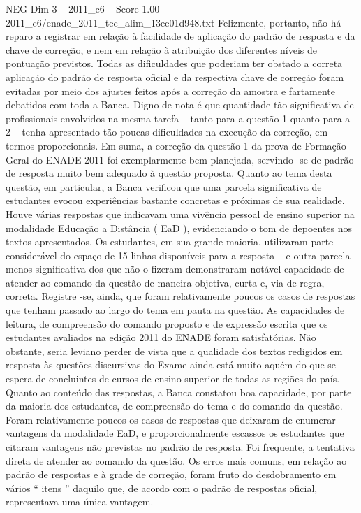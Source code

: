 \begin{textsample}{NEG Dim 3 – 2011\_c6 – Score 1.00 – 2011\_c6/enade\_2011\_tec\_alim\_13ee01d948.txt}
Felizmente, portanto, não há reparo a registrar em relação à facilidade de aplicação do padrão de resposta e da chave de correção, e nem em relação à atribuição dos diferentes níveis de pontuação previstos.
Todas as dificuldades que poderiam ter obstado a correta aplicação do padrão de resposta oficial e da respectiva chave de correção foram evitadas por meio dos ajustes feitos após a correção da amostra e fartamente debatidos com toda a Banca.
Digno de nota é que quantidade tão significativa de profissionais envolvidos na mesma tarefa – tanto para a questão 1 quanto para a 2 – tenha apresentado tão poucas dificuldades na execução da correção, em termos proporcionais.
Em suma, a correção da questão 1 da prova de Formação Geral do ENADE 2011 foi exemplarmente bem planejada, servindo -se de padrão de resposta muito bem adequado à questão proposta.
Quanto ao tema desta questão, em particular, a Banca verificou que uma parcela significativa de estudantes evocou experiências bastante concretas e próximas de sua realidade.
Houve várias respostas que indicavam uma vivência pessoal de ensino superior na modalidade Educação a Distância ( EaD ), evidenciando o tom de depoentes nos textos apresentados.
Os estudantes, em sua grande maioria, utilizaram parte considerável do espaço de 15 linhas disponíveis para a resposta – e outra parcela menos significativa dos que não o fizeram demonstraram notável capacidade de atender ao comando da questão de maneira objetiva, curta e, via de regra, correta.
Registre -se, ainda, que foram relativamente poucos os casos de respostas que tenham passado ao largo do tema em pauta na questão.
As capacidades de leitura, de compreensão do comando proposto e de expressão escrita que os estudantes avaliados na edição 2011 do ENADE foram satisfatórias.
Não obstante, seria leviano perder de vista que a qualidade dos textos redigidos em resposta às questões discursivas do Exame ainda está muito aquém do que se espera de concluintes de cursos de ensino superior de todas as regiões do país.
Quanto ao conteúdo das respostas, a Banca constatou boa capacidade, por parte da maioria dos estudantes, de compreensão do tema e do comando da questão.
Foram relativamente poucos os casos de respostas que deixaram de enumerar vantagens da modalidade EaD, e proporcionalmente escassos os estudantes que citaram vantagens não previstas no padrão de resposta.
Foi frequente, a tentativa direta de atender ao comando da questão.
Os erros mais comuns, em relação ao padrão de respostas e à grade de correção, foram fruto do desdobramento em vários “ itens ” daquilo que, de acordo com o padrão de respostas oficial, representava uma única vantagem.

\end{textsample}

